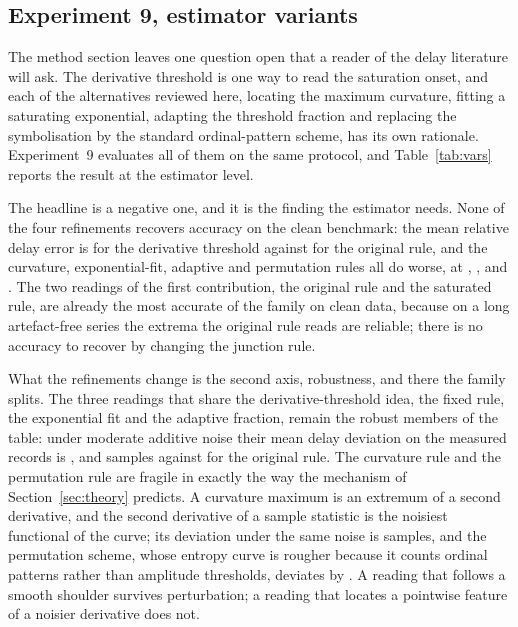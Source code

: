 \documentclass[10pt,a4paper,twocolumn]{article}
\begin{document}
\subsection{Experiment 9, estimator variants}
\label{sec:exp9}

The method section leaves one question open that a reader of the delay
literature will ask.  The derivative threshold is one way to read the
saturation onset, and each of the alternatives reviewed here, locating the
maximum curvature, fitting a saturating exponential, adapting the threshold
fraction and replacing the symbolisation by the standard ordinal-pattern
scheme, has its own rationale.  Experiment~9 evaluates all of them on the same
protocol, and Table~\ref{tab:vars} reports the result at the estimator level.

The headline is a negative one, and it is the finding the estimator needs.
None of the four refinements recovers accuracy on the clean benchmark: the
mean relative delay error is \varTauLPF{} for the derivative threshold against
\varTauSE{} for the original rule, and the curvature, exponential-fit,
adaptive and permutation rules all do worse, at \varTauCURV{},
\varTauFIT{}, \varTauADP{} and \varTauPE{}.  The two readings of the first
contribution, the original rule and the saturated rule, are already the most
accurate of the family on clean data, because on a long artefact-free series
the extrema the original rule reads are reliable; there is no accuracy to
recover by changing the junction rule.

What the refinements change is the second axis, robustness, and there the
family splits.  The three readings that share the derivative-threshold idea,
the fixed rule, the exponential fit and the adaptive fraction, remain the
robust members of the table: under moderate additive noise their mean delay
deviation on the measured records is \varRotorNoiseLPF{},
\varRotorNoiseFIT{} and \varRotorNoiseADP{} samples against
\varRotorNoiseSE{} for the original rule.  The curvature rule and the
permutation rule are fragile in exactly the way the mechanism of
Section~\ref{sec:theory} predicts.  A curvature maximum is an extremum of a
second derivative, and the second derivative of a sample statistic is the
noisiest functional of the curve; its deviation under the same noise is
\varRotorNoiseCURV{} samples, and the permutation scheme, whose entropy curve
is rougher because it counts ordinal patterns rather than amplitude
thresholds, deviates by \varRotorNoisePE{}.  A reading that follows a smooth
shoulder survives perturbation; a reading that locates a pointwise feature of
a noisier derivative does not.
\end{document}
